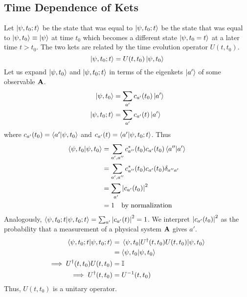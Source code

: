 \documentclass[12pt,a4paper,titlepage]{article}
\begin{document}
\subsection{Time Dependence of Kets}
Let $\ket{\psi,t_{0};t}$ be the state that was equal to $\ket{\psi,t_{0};t}$ be the state that was equal to $\ket{\psi,t_{0}}\equiv\ket{\psi}$ at time $t_{0}$ which becomes a different state $\ket{\psi,t_{0}=t}$ at a later time $t>t_{0}$. The two kets are related by the time evolution operator $U(t,t_{0})$.
\begin{equation}
\ket{\psi,t_{0};t}=U(t,t_{0})\ket{\psi,t_{0}}
\end{equation}
Let us expand $\ket{\psi,t_{0}}$ and $\ket{\psi,t_{0};t}$ in terms of the eigenkets $\ket{a'}$ of some observable $\vb{A}$.
\begin{equation}
\begin{aligned}
\ket{\psi,t_{0}}&=\sum_{a'}c_{a'}(t_{0})\ket{a'}\\
\ket{\psi,t_{0};t}&=\sum_{a'}c_{a'}(t)\ket{a'}
\end{aligned}
\end{equation}
where $c_{a'}(t_{0})=\ip{a'}{\psi,t_{0}}$ and $c_{a'}(t)=\ip{a'}{\psi,t_{0};t}$. Thus
\begin{equation}
\begin{aligned}
\ip{\psi,t_{0}}&=\sum_{a',a''}c_{a''}^{*}(t_{0})c_{a'}(t_{0})\ip{a''}{a'}\\
&=\sum_{a',a''}c_{a''}^{*}(t_{0})c_{a'}(t_{0})\delta_{a''a'}\\
&=\sum_{a'}\abs{c_{a'}(t_{0})}^{2}\\
&=1\qq{by normalization}
\end{aligned}
\end{equation}
Analogously, $\ip{\psi,t_{0};t}=\sum_{a'}\abs{c_{a'}(t)}^{2}=1$. We interpret $\abs{c_{a'}(t_{0})}^{2}$ as the probability that a measurement of a physical system $\vb{A}$ gives $a'$.
\begin{equation}
\begin{aligned}
\ip{\psi,t_{0};t}&=\mel{\psi,t_{0}}{U^{\dagger}(t,t_{0})U(t,t_{0})}{\psi,t_{0}}\\
&=\ip{\psi,t_{0}}\\
\implies U^{\dagger}(t,t_{0})U(t,t_{0})&=\mathbb{I}\\
\implies U^{\dagger}(t,t_{0})&=U^{-1}(t,t_{0})
\end{aligned}
\end{equation}
Thus, $U(t,t_{0})$ is a unitary operator.\\
\end{document}
